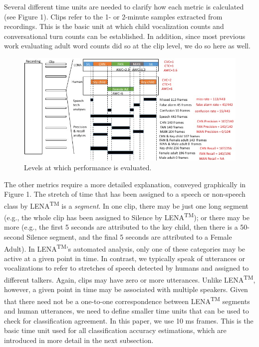 \documentclass[english,table,man,floatsintext]{apa6}
\begin{document}
Several different time units are needed to clarify how each metric is calculated (see Figure 1). Clips refer to the 1- or 2-minute samples extracted from recordings. This is the basic unit at which child vocalization counts and conversational turn counts can be established. In addition, since most previous work evaluating adult word counts did so at the clip level, we do so here as well.

\begin{figure}
\centering
\includegraphics{fig_levels.jpg}
\caption{Levels at which performance is evaluated.}
\end{figure}

The other metrics require a more detailed explanation, conveyed graphically in Figure 1. The stretch of time that has been assigned to a speech or non-speech class by LENA\textsuperscript{TM} is a \emph{segment}. In one clip, there may be just one long segment (e.g., the whole clip has been assigned to Silence by LENA\textsuperscript{TM}); or there may be more (e.g., the first 5 seconds are attributed to the key child, then there is a 50-second Silence segment, and the final 5 seconds are attributed to a Female Adult). In LENA\textsuperscript{TM}'s automated analysis, only one of these categories may be active at a given point in time. In contrast, we typically speak of utterances or vocalizations to refer to stretches of speech detected by humans and assigned to different talkers. Again, clips may have zero or more utterances. Unlike LENA\textsuperscript{TM}, however, a given point in time may be associated with multiple speakers.
Given that there need not be a one-to-one correspondence between LENA\textsuperscript{TM} segments and human utterances, we need to define smaller time units that can be used to check for classification agreement. In this paper, we use 10 ms frames. This is the basic time unit used for all classification accuracy estimations, which are introduced in more detail in the next subsection.
\end{document}
